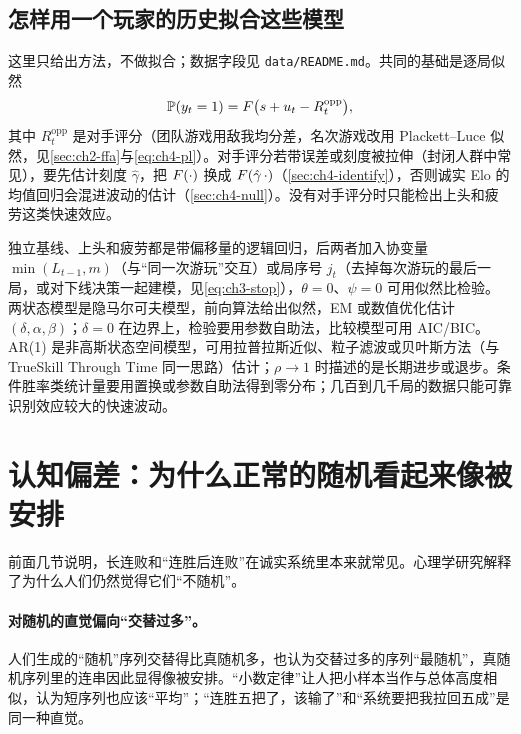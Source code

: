 \subsection{怎样用一个玩家的历史拟合这些模型}
\label{sec:ch3-fit}

这里只给出方法，不做拟合；数据字段见 \texttt{data/README.md}。共同的基础是逐局似然
\[
\mathbb{P}(y_t=1)=F\big(s+u_t-R^{\text{opp}}_t\big),
\]
其中 $R^{\text{opp}}_t$ 是对手评分（团队游戏用敌我均分差，名次游戏改用 Plackett–Luce 似然，见\cref{sec:ch2-ffa}与\cref{eq:ch4-pl}）。对手评分若带误差或刻度被拉伸（封闭人群中常见），要先估计刻度 $\hat\gamma$，把 $F(\cdot)$ 换成 $F(\hat\gamma\,\cdot)$（\cref{sec:ch4-identify}），否则诚实 Elo 的均值回归会混进波动的估计（\cref{sec:ch4-null}）。没有对手评分时只能检出上头和疲劳这类快速效应。

独立基线、上头和疲劳都是带偏移量的逻辑回归，后两者加入协变量 $\min(L_{t-1},m)$（与“同一次游玩”交互）或局序号 $j_t$（去掉每次游玩的最后一局，或对下线决策一起建模，见\cref{eq:ch3-stop}），$\theta=0$、$\psi=0$ 可用似然比检验。两状态模型是隐马尔可夫模型，前向算法给出似然，EM 或数值优化估计 $(\delta,\alpha,\beta)$；$\delta=0$ 在边界上，检验要用参数自助法，比较模型可用 AIC/BIC。AR(1) 是非高斯状态空间模型，可用拉普拉斯近似、粒子滤波或贝叶斯方法（与 TrueSkill Through Time 同一思路）估计；$\rho\to1$ 时描述的是长期进步或退步。条件胜率类统计量要用置换或参数自助法得到零分布；几百到几千局的数据只能可靠识别效应较大的快速波动。

\section{认知偏差：为什么正常的随机看起来像被安排}
\label{sec:ch3-bias}

前面几节说明，长连败和“连胜后连败”在诚实系统里本来就常见。心理学研究解释了为什么人们仍然觉得它们“不随机”。

\paragraph{对随机的直觉偏向“交替过多”。} 人们生成的“随机”序列交替得比真随机多，也认为交替过多的序列“最随机”\cite{falk1997making}\tagLit，真随机序列里的连串因此显得像被安排。“小数定律”让人把小样本当作与总体高度相似，认为短序列也应该“平均”\cite{tversky1971belief}\tagLit；“连胜五把了，该输了”和“系统要把我拉回五成”是同一种直觉。

